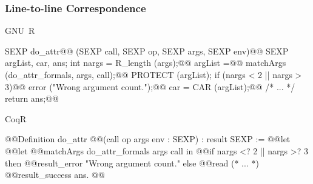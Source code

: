 \documentclass{beamer}
\begin{document}
\begin{frame}[fragile]
    \frametitle{Line-to-line Correspondence}

    \begin{widemargin}\centering{}
\begin{minipage}{.53\textwidth}
      GNU~R
\begin{ccode}[fontsize=\tiny]
SEXP do_attr@@
    (SEXP call, SEXP op, SEXP args, SEXP env){@@
  SEXP argList, car, ans;
  int nargs = R_length (args);@@
  argList =@@
    matchArgs (do_attr_formals, args, call);@@
  PROTECT (argList);
  if (nargs < 2 || nargs > 3)@@
    error ("Wrong argument count.");@@
  car = CAR (argList);@@
  /* ... */
  return ans;@@
}
\end{ccode}
\end{minipage}
\qquad
\begin{minipage}{.5\textwidth}
  CoqR
\begin{coqcode}[fontsize=\tiny]
@@Definition do_attr
    @@(call op args env : SEXP)
    : result SEXP :=
  @@let%
  @@let%
    @@matchArgs do_attr_formals args call in
  @@if nargs <? 2 || nargs >? 3 then
    @@result_error "Wrong argument count."
  else
    @@read%
    (* ... *)
    @@result_success ans.
@@
\end{coqcode}
\end{minipage}
    \end{widemargin}


\end{frame}
\end{document}
